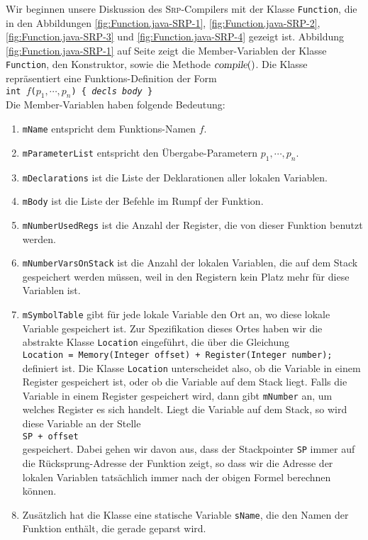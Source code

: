 Wir beginnen unsere Diskussion des \textsc{Srp}-Compilers mit der Klasse
\texttt{Function}, die in den Abbildungen \ref{fig:Function.java-SRP-1},
\ref{fig:Function.java-SRP-2}, \ref{fig:Function.java-SRP-3} und
\ref{fig:Function.java-SRP-4} gezeigt ist.
Abbildung \ref{fig:Function.java-SRP-1} auf Seite \pageref{fig:Function.java-SRP-1} zeigt die
Member-Variablen der Klasse \texttt{Function}, den Konstruktor, sowie die Methode
$\textsl{compile}()$.  Die Klasse repr\"asentiert eine Funktions-Definition der Form
\\[0.2cm]
\hspace*{1.3cm}
\texttt{int $f$($p_1, \cdots, p_n$) \{ \textsl{decls}\ \textsl{body} \}}
\\[0.2cm]
Die Member-Variablen haben folgende Bedeutung:
\begin{enumerate}
\item \texttt{mName} entspricht dem Funktions-Namen $f$.
\item \texttt{mParameterList} entspricht den \"Ubergabe-Parametern $p_1, \cdots, p_n$.
\item \texttt{mDeclarations} ist die Liste der Deklarationen aller lokalen Variablen.
\item \texttt{mBody} ist die Liste der Befehle im Rumpf der Funktion.
\item \texttt{mNumberUsedRegs} ist die Anzahl der Register, die von dieser Funktion
      benutzt werden.
\item \texttt{mNumberVarsOnStack} ist die Anzahl der lokalen Variablen, die auf dem Stack
      gespeichert werden m\"ussen, weil in den Registern kein Platz mehr f\"ur diese Variablen ist.
\item \texttt{mSymbolTable} gibt f\"ur jede lokale Variable den Ort an, wo diese lokale
      Variable gespeichert ist.  Zur Spezifikation dieses Ortes haben wir die abstrakte
      Klasse \texttt{Location} eingef\"uhrt, die \"uber die Gleichung
      \\[0.2cm]
      \hspace*{1.3cm}
      \texttt{Location = Memory(Integer offset) + Register(Integer number);}
      \\[0.2cm]
      definiert ist.  Die Klasse \texttt{Location} unterscheidet also, ob die Variable in
      einem Register gespeichert ist, oder ob die Variable auf dem Stack liegt.
      Falls die Variable in einem Register gespeichert wird, dann gibt \texttt{mNumber}
      an, um welches Register es sich handelt.  Liegt die Variable auf dem Stack, so wird
      diese Variable an der Stelle
      \\[0.2cm]
      \hspace*{1.3cm}
      \texttt{SP + offset}
      \\[0.2cm]
      gespeichert.  Dabei gehen wir davon aus, dass der Stackpointer \texttt{SP} immer auf
      die R\"ucksprung-Adresse der Funktion zeigt, so dass wir die Adresse der lokalen
      Variablen tats\"achlich immer nach der obigen Formel berechnen k\"onnen.
\item Zus\"atzlich hat die Klasse eine statische Variable \texttt{sName}, die den Namen
      der Funktion enth\"alt, die gerade geparst wird.
\end{enumerate}

